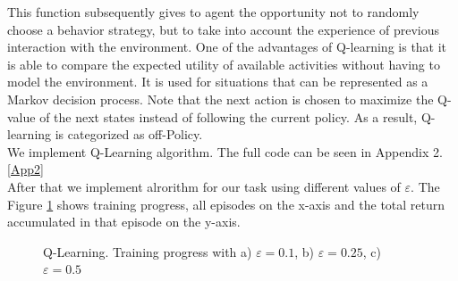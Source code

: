 \documentclass[a4paper, twoside, english]{article}
\begin{document}
This function subsequently gives to agent the opportunity not to randomly choose a behavior strategy, but to take into account the experience of previous interaction with the environment. One of the advantages of Q-learning is that it is able to compare the expected utility of available activities without having to model the environment. It is used for situations that can be represented as a Markov decision process. Note that the next action is chosen to maximize the Q-value of the next states instead of following the current policy. As a result, Q-learning is categorized as off-Policy.\\
We implement Q-Learning algorithm. The full code can be seen in Appendix 2. \ref{App2}\\
After that we implement alrorithm for our task using different values of $\varepsilon$. The Figure \ref{fig:Q_Learn1_eps} shows training progress, all episodes on the x-axis and the total return accumulated in that episode on the y-axis.\\

\begin{figure}[h!]
	\centerline
	{
		\quad
		\quad
	}
	\caption[null]{Q-Learning. Training progress with a) $\varepsilon= 0.1$, b) $\varepsilon= 0.25$, c) $\varepsilon= 0.5$}
	\label{fig:Q_Learn1_eps}
\end{figure}
\end{document}
